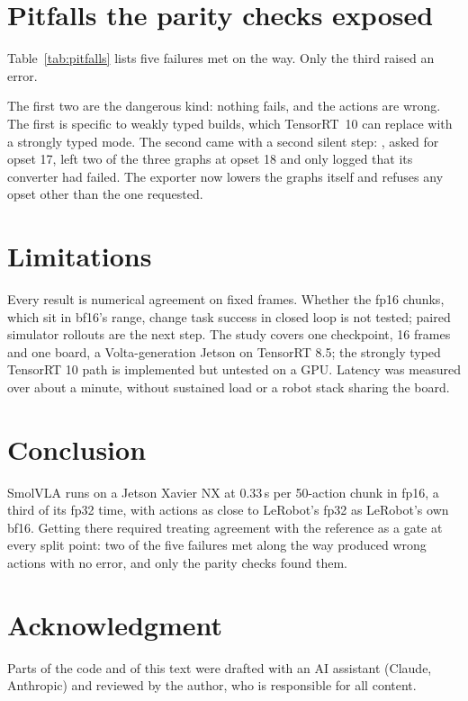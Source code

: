 \documentclass[conference]{IEEEtran}
\begin{document}
\section{Pitfalls the parity checks exposed}
\label{sec:pitfalls}
Table~\ref{tab:pitfalls} lists five failures met on the way. Only the third raised an error.

The first two are the dangerous kind: nothing fails, and the actions are wrong. The first is specific to weakly typed builds, which TensorRT~10 can replace with a strongly typed mode. The second came with a second silent step: , asked for opset 17, left two of the three graphs at opset 18 and only logged that its converter had failed. The exporter now lowers the graphs itself and refuses any opset other than the one requested.

\section{Limitations}
\label{sec:limits}
Every result is numerical agreement on fixed frames. Whether the fp16 chunks, which sit in bf16's range, change task success in closed loop is not tested; paired simulator rollouts are the next step. The study covers one checkpoint, 16 frames and one board, a Volta-generation Jetson on TensorRT 8.5; the strongly typed TensorRT 10 path is implemented but untested on a GPU. Latency was measured over about a minute, without sustained load or a robot stack sharing the board.

\section{Conclusion}
SmolVLA runs on a Jetson Xavier NX at 0.33\,s per 50-action chunk in fp16, a third of its fp32 time, with actions as close to LeRobot's fp32 as LeRobot's own bf16. Getting there required treating agreement with the reference as a gate at every split point: two of the five failures met along the way produced wrong actions with no error, and only the parity checks found them.

\section*{Acknowledgment}
Parts of the code and of this text were drafted with an AI assistant (Claude, Anthropic) and reviewed by the author, who is responsible for all content.



\end{document}
